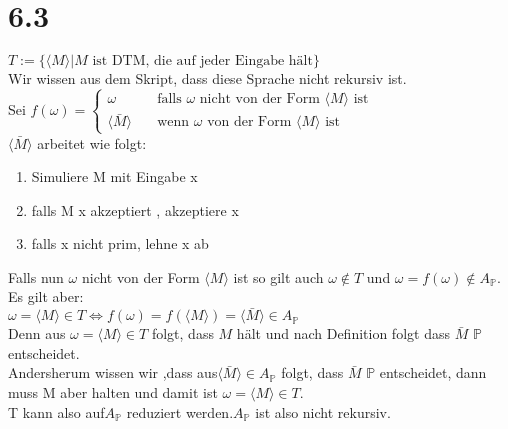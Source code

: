 \documentclass[10pt,a4paper]{article}
\begin{document}
\section*{6.3}
$T:=\{\langle M\rangle|M \text{ ist DTM, die auf jeder Eingabe hält}\}$
\\Wir wissen aus dem Skript, dass diese Sprache nicht rekursiv ist.
\\Sei
 $
 f(\omega) =
\begin{cases}
\omega      & \quad \text{falls } \omega \text{ nicht von der Form } \langle M\rangle\text{ ist }\\
\langle \bar{M} \rangle  & \quad \text{wenn } \omega \text{ von der Form } \langle M\rangle\text{ ist }
\end{cases}
$
\\$\langle \bar{M} \rangle$ arbeitet wie folgt:
\begin{enumerate}
	\item Simuliere M mit Eingabe x
	\item falls M x akzeptiert , akzeptiere x
	\item falls x nicht prim, lehne x ab
\end{enumerate}
Falls nun $\omega$ nicht von der Form $\langle M\rangle$ ist so gilt auch $\omega \notin T$ und $ \omega = f(\omega) \notin A_\mathbb{P}.$
\\Es gilt aber:
\\$\omega =\langle M\rangle \in T \Leftrightarrow f(\omega)=f(\langle M\rangle)=\langle \bar{M} \rangle \in A_\mathbb{P}
$ 
\\Denn aus $\omega =\langle M\rangle \in T$ folgt, dass $ M $ hält und nach Definition folgt dass $ \bar{M} $ $\mathbb{P}$ entscheidet.
\\ Andersherum wissen wir ,dass aus$\langle \bar{M} \rangle \in A_\mathbb{P}$ folgt, dass  $ \bar{M} $ $\mathbb{P}$ entscheidet, dann muss M aber halten und damit ist $\omega =\langle M\rangle \in T$.
\\T kann also auf$A_\mathbb{P}$ reduziert werden.$A_\mathbb{P}$ ist also nicht rekursiv.
\end{document}
